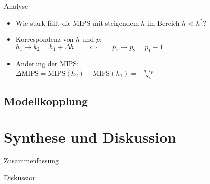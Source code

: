 \documentclass[beamer, xcolor=table]{beamer}
\begin{document}
	\begin{frame}{Analyse}		
		\begin{itemize}
			\item<1-> Wie stark fällt die MIPS mit steigendem $h$ im Bereich $h$ < $h^*$?
			\item<2-> Korrespondenz von $h$ und $p$: \\ $h_1 \rightarrow h_2 = h_1 + \Delta h \qquad \Leftrightarrow \qquad p_1 \rightarrow p_2 = p_1 -1$
			\item<3-> Änderung der MIPS: \\ $\Delta \text{MIPS} = \text{MIPS}(h_2) - \text{MIPS}(h_1) = - \frac{q \cdot i_P}{S_D}$
		\end{itemize}
		\begin{center}
			\resizebox{0.5\linewidth}{!}{
				
			}
		\end{center}
	\end{frame}

    \subsection{Modellkopplung}
    \section{Synthese und Diskussion}
	\begin{frame}{Zusammenfassung}
	\end{frame}
	\begin{frame}{Diskussion}
	\end{frame}
\end{document}
